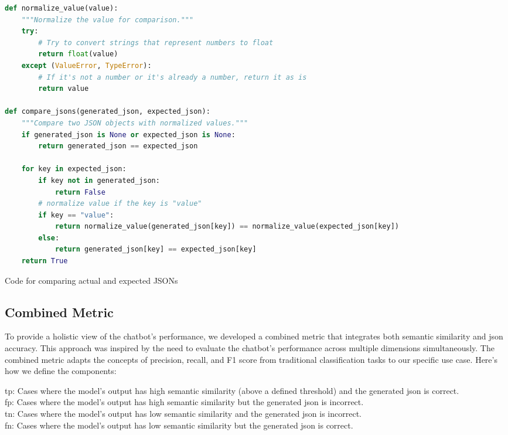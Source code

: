 \begin{Listing}
    \begin{lstlisting}[language=Python]
def normalize_value(value):
    """Normalize the value for comparison."""
    try:
        # Try to convert strings that represent numbers to float
        return float(value)
    except (ValueError, TypeError):
        # If it's not a number or it's already a number, return it as is
        return value

def compare_jsons(generated_json, expected_json):
    """Compare two JSON objects with normalized values."""
    if generated_json is None or expected_json is None:
        return generated_json == expected_json
    
    for key in expected_json:
        if key not in generated_json:
            return False
        # normalize value if the key is "value"
        if key == "value":
            return normalize_value(generated_json[key]) == normalize_value(expected_json[key])
        else:
            return generated_json[key] == expected_json[key]
    return True
    \end{lstlisting}
    \caption{Code for comparing actual and expected JSONs}
    \label{lst:compare-json}   
\end{Listing}


\subsection{Combined Metric}

To provide a holistic view of the chatbot's performance, we developed a combined metric that integrates both semantic similarity and \gls{json} accuracy. This approach was inspired by the need to evaluate the chatbot's performance across multiple dimensions simultaneously.
The combined metric adapts the concepts of precision, recall, and F1 score from traditional classification tasks to our specific use case. Here's how we define the components:

\gls{tp}: Cases where the model's output has high semantic similarity (above a defined threshold) and the generated \gls{json} is correct.\\
\gls{fp}: Cases where the model's output has high semantic similarity but the generated \gls{json} is incorrect.\\
\gls{tn}: Cases where the model's output has low semantic similarity and the  generated \gls{json} is incorrect.\\
\gls{fn}: Cases where the model's output has low semantic similarity but the generated \gls{json} is correct.

